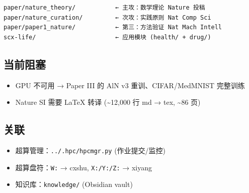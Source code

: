 \documentclass[
  12pt,
]{ctexart}
\providecommand{\tightlist}{%
  \setlength{\itemsep}{0pt}\setlength{\parskip}{0pt}}
\begin{document}
\begin{verbatim}
paper/nature_theory/           ← 主攻：数学理论 Nature 投稿
paper/nature_curation/         ← 次攻：实践原则 Nat Comp Sci
paper/paper1_nature/           ← 第三：方法验证 Nat Mach Intell
scx-life/                      ← 应用模块 (health/ + drug/)
\end{verbatim}

\subsection{当前阻塞}\label{ux5f53ux524dux963bux585e}

\begin{itemize}
\tightlist
\item
  GPU 不可用 → Paper III 的 AlN v3 重训、CIFAR/MedMNIST 完整训练
\item
  Nature SI 需要 LaTeX 转译 (\textasciitilde12,000 行 md → tex,
  \textasciitilde86 页)
\end{itemize}

\subsection{关联}\label{ux5173ux8054}

\begin{itemize}
\tightlist
\item
  超算管理：\texttt{../.hpc/hpcmgr.py} (作业提交/监控)
\item
  超算盘符：\texttt{W:} → cxshu, \texttt{X:/Y:/Z:} → xiyang
\item
  知识库：\texttt{knowledge/} (Obsidian vault)
\end{itemize}
\end{document}
